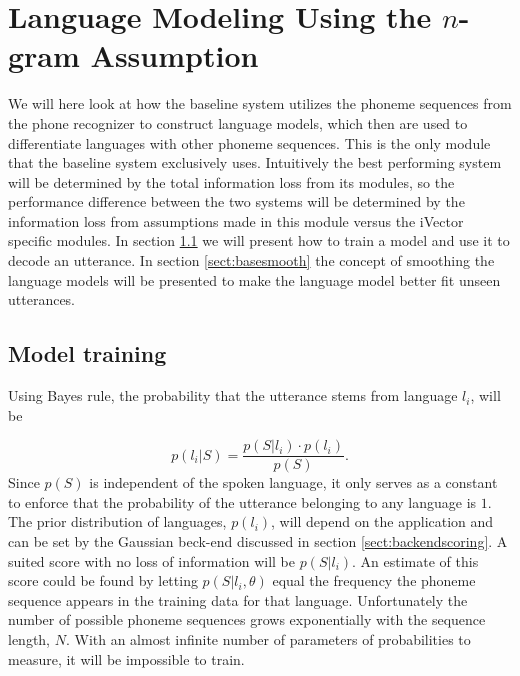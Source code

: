 \chapter{Language Modeling Using the $n$-gram Assumption}

We will here look at how the baseline system utilizes the phoneme sequences from the phone recognizer to construct language models, which then are used to differentiate languages with other phoneme sequences. This is the only module that the baseline system exclusively uses. Intuitively the best performing system will be determined by the total information loss from its modules, so the performance difference between the two systems will be determined by the information loss from assumptions made in this module versus the iVector specific modules. In section \ref{sect:basetrain} we will present how to train a model and use it to decode an utterance. In section \ref{sect:basesmooth} the concept of smoothing the language models will be presented to make the language model better fit unseen utterances.

\section{Model training}
\label{sect:basetrain}

Using Bayes rule, the probability that the utterance stems from language $l_i$, will be

\begin{equation}
\label{basebayes}
p(l_i|S) = \frac{p(S|l_i) \cdot p(l_i)}{p(S)}.
\end{equation}
Since $p(S)$ is independent of the spoken language, it only serves as a constant to enforce that the probability of the utterance belonging to any language is $1$. The prior distribution of languages, $p(l_i)$, will depend on the application and can be set by the Gaussian beck-end discussed in section \ref{sect:backendscoring}. A suited score with no loss of information will be $p(S|l_i)$. An estimate of this score could be found by letting $p(S|l_i, \theta)$ equal the frequency the phoneme sequence appears in the training data for that language. Unfortunately the number of possible phoneme sequences grows exponentially with the sequence length, $N$. With an almost infinite number of parameters of probabilities to measure, it will be impossible to train. 

